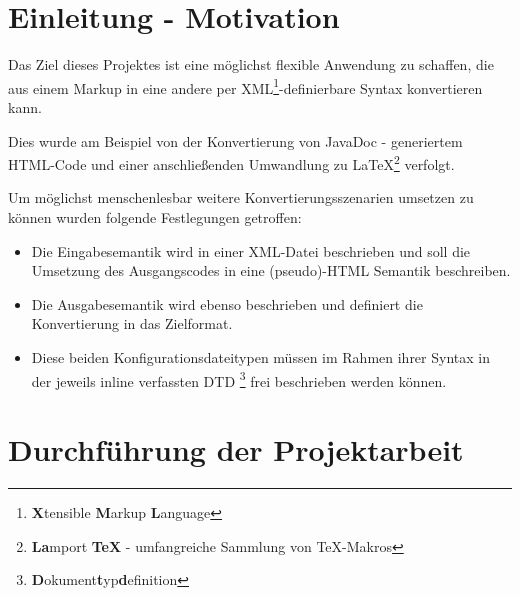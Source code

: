 \documentclass[	a4paper,		%
		titlepage, 		%
		fontsize=12pt		%
		]{scrartcl} 		%
\begin{document}
\section{Einleitung - Motivation}
Das Ziel dieses Projektes ist eine möglichst flexible Anwendung zu schaffen, die aus einem Markup in eine andere per XML\footnote{\textbf{X}tensible \textbf{M}arkup \textbf{L}anguage}-definierbare Syntax konvertieren kann.

Dies wurde am Beispiel von der Konvertierung von JavaDoc - generiertem HTML-Code und einer anschließenden Umwandlung zu \LaTeX\footnote{\textbf{La}mport \textbf{TeX} - umfangreiche Sammlung von TeX-Makros} verfolgt.

Um möglichst menschenlesbar weitere Konvertierungsszenarien umsetzen zu können wurden folgende Festlegungen getroffen:
\begin{itemize}
 \item Die Eingabesemantik wird in einer XML-Datei beschrieben und soll die Umsetzung des Ausgangscodes in eine (pseudo)-HTML Semantik beschreiben.
 \item Die Ausgabesemantik wird ebenso beschrieben und definiert die Konvertierung in das Zielformat.
 \item Diese beiden Konfigurationsdateitypen müssen im Rahmen ihrer Syntax in der jeweils inline verfassten DTD \footnote{\textbf{D}okument\textbf{t}yp\textbf{d}efinition} frei beschrieben werden können.
\end{itemize}

\section{Durchführung der Projektarbeit}
\end{document}
